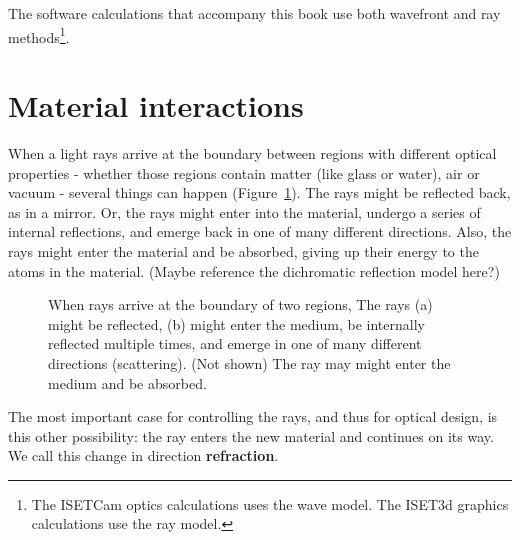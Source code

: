 \documentclass[
  letterpaper,
]{book}
\begin{document}
The software calculations that accompany this book use both wavefront
and ray methods\footnote{The ISETCam optics calculations uses the wave
  model. The ISET3d graphics calculations use the ray model.}.

\section{Material interactions}\label{material-interactions}

When a light rays arrive at the boundary between regions with different
optical properties - whether those regions contain matter (like glass or
water), air or vacuum - several things can happen
(Figure~\ref{fig-reflected-scattered}). The rays might be reflected
back, as in a mirror. Or, the rays might enter into the material,
undergo a series of internal reflections, and emerge back in one of many
different directions. Also, the rays might enter the material and be
absorbed, giving up their energy to the atoms in the material. (Maybe
reference the dichromatic reflection model here?)

\begin{figure}


\caption{\label{fig-reflected-scattered}When rays arrive at the boundary
of two regions, The rays (a) might be reflected, (b) might enter the
medium, be internally reflected multiple times, and emerge in one of
many different directions (scattering). (Not shown) The ray may might
enter the medium and be absorbed.}

\end{figure}%

The most important case for controlling the rays, and thus for optical
design, is this other possibility: the ray enters the new material and
continues on its way. We call this change in direction
\textbf{refraction}.
\end{document}

